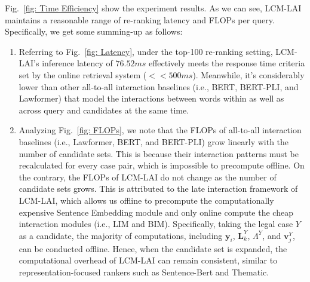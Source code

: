 Fig.~\ref{fig: Time Efficiency} show the experiment results.
As we can see, LCM-LAI maintains a reasonable range of re-ranking latency and FLOPs per query.
Specifically, we get some summing-up as follows:

\begin{figure*}[t]
\centering
  \hspace{5mm}
\caption{The performance of efficiency evaluation.
(a) Time latency under the top-100 re-ranking setting.
(b) FLOPs (in millions) per query of the re-ranking depth $k$.
To make an even distribution, we use logarithmic coordinates for sub-figure (b) abscissa.
}
\label{fig: Time Efficiency}
\end{figure*}

\begin{enumerate}
    \item {
    Referring to Fig.~\ref{fig: Latency}, under the top-100 re-ranking setting, LCM-LAI's inference latency of $76.52ms$ effectively meets the response time criteria set by the online retrieval system ($<<500ms$). Meanwhile, it's considerably lower than other all-to-all interaction baselines (i.e., BERT, BERT-PLI, and Lawformer) that model the interactions between words within as well as across query and candidates at the same time.
    }
    \item {
    Analyzing Fig.~\ref{fig: FLOPs}, we note that the FLOPs of all-to-all interaction baselines (i.e., Lawformer, BERT, and BERT-PLI) grow linearly with the number of candidate sets.
    This is because their interaction patterns must be recalculated for every case pair, which is impossible to precompute offline.
    On the contrary, the FLOPs of LCM-LAI do not change as the number of candidate sets grows.
    This is attributed to the late interaction framework of LCM-LAI, which allows us offline to precompute the computationally expensive Sentence Embedding module and only online compute the cheap interaction modules (i.e., LIM and BIM).
    Specifically, taking the legal case $Y$ as a candidate, the majority of computations, including $\mathbf{y}_i$, $\mathbf{L}_k^Y$, $\Lambda^{Y}$, and $\mathbf{v}_j^Y$, can be conducted offline.
    Hence, when the candidate set is expanded, the computational overhead of LCM-LAI can remain consistent, similar to representation-focused rankers such as Sentence-Bert and Thematic.
    }
\end{enumerate}

